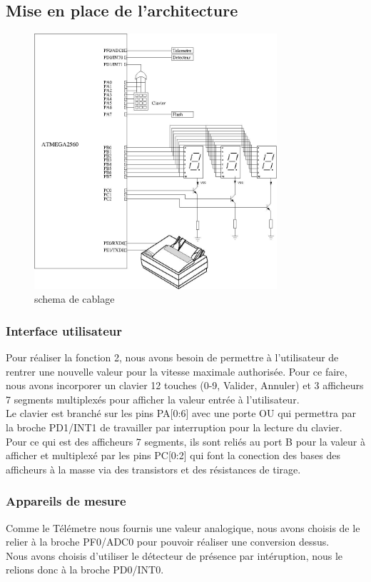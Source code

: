 \documentclass[a4paper, 12pt]{article}
\begin{document}
		\subsection{Mise en place de l'architecture}
		\begin{figure}[h]
		\centering
		\includegraphics[width = 9cm]{schema.jpg}
		\caption{schema de cablage}
		\end{figure}
		\newpage
		\subsubsection{Interface utilisateur}
		Pour réaliser la fonction 2, nous avons besoin de permettre à l'utilisateur de rentrer une nouvelle valeur pour la vitesse maximale authorisée. Pour ce faire, nous avons incorporer un clavier 12 touches (0-9, Valider, Annuler) et 3 afficheurs 7 segments multiplexés pour afficher la valeur entrée à l'utilisateur.\\
		Le clavier est branché sur les pins PA[0:6] avec une porte OU qui permettra par la broche PD1/INT1 de travailler par interruption pour la lecture du clavier.\\
		Pour ce qui est des afficheurs 7 segments, ils sont reliés au port B pour la valeur à afficher et multiplexé par les pins PC[0:2] qui font la conection des bases des afficheurs à la masse via des transistors et des résistances de tirage.
		\subsubsection{Appareils de mesure}
		Comme le Télémetre nous fournis une valeur analogique, nous avons choisis de le relier à la broche PF0/ADC0 pour pouvoir réaliser une conversion dessus.\\
		Nous avons choisis d'utiliser le détecteur de présence par intéruption, nous le relions donc à la broche PD0/INT0.\\
\end{document}
